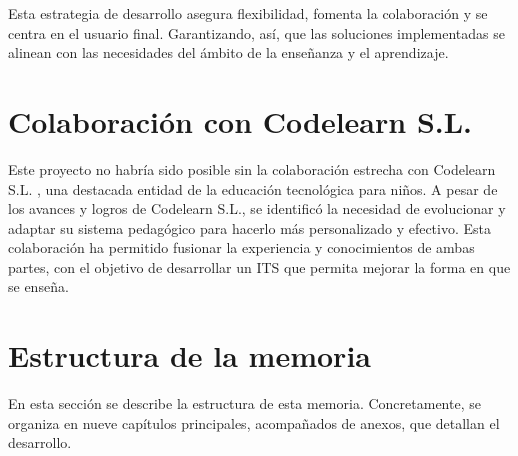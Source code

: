 Esta estrategia de desarrollo asegura flexibilidad, fomenta la colaboración y se centra en el usuario final. Garantizando, así, que las soluciones implementadas se alinean con las necesidades del ámbito de la enseñanza y el aprendizaje.

\section{Colaboración con Codelearn S.L.}

Este proyecto no habría sido posible sin la colaboración estrecha con Codelearn S.L. \cite{codelearn}, una destacada entidad de la educación tecnológica para niños. A pesar de los avances y logros de Codelearn S.L., se identificó la necesidad de evolucionar y adaptar su sistema pedagógico para hacerlo más personalizado y efectivo. Esta colaboración ha permitido fusionar la experiencia y conocimientos de ambas partes, con el objetivo de desarrollar un ITS que permita mejorar la forma en que se enseña.

\section{Estructura de la memoria}

En esta sección se describe la estructura de esta memoria. Concretamente, se organiza en nueve capítulos principales, acompañados de anexos, que detallan el desarrollo. 


